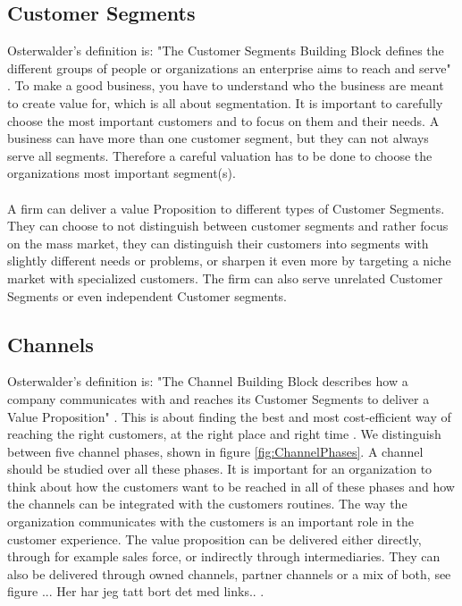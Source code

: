 \subsection{Customer Segments}
Osterwalder's definition is: "The Customer Segments Building Block defines the different groups of people or organizations an enterprise aims to reach and serve" \cite{osterwalder}. To make a good business, you have to understand who the business are meant to create value for, which is all about segmentation. It is important to carefully choose the most important customers and to focus on them and their needs. A business can have more than one customer segment, but they can not always serve all segments. Therefore a careful valuation has to be done to choose the organizations most important segment(s). \cite{osterwalder} \cite{osterwalderthesis} \\ \\
A firm can deliver a value Proposition to different types of Customer Segments. They can choose to not distinguish between customer segments and rather focus on the mass market, they can distinguish their customers into segments with slightly different needs or problems, or sharpen it even more by targeting a niche market with specialized customers. The firm can also serve unrelated Customer Segments or even independent Customer segments. \cite{osterwalder}

\subsection{Channels}
Osterwalder's definition is: "The Channel Building Block describes how a company communicates with and reaches its Customer Segments to deliver a Value Proposition" \cite{osterwalder}. This is about finding the best and most cost-efficient way of reaching the right customers, at the right place and right time \cite{osterwalderthesis}. We distinguish between five channel phases, shown in figure \ref{fig:ChannelPhases}. A channel should be studied over all these phases. It is important for an organization to think about how the customers want to be reached in all of these phases and how the channels can be integrated with the customers routines. The way the organization communicates with the customers is an important role in the customer experience. The value proposition can be delivered either directly, through for example sales force, or indirectly through intermediaries. They can also be delivered through owned channels, partner channels or a mix of both, see figure ...  Her har jeg tatt bort det med links.. 
 \cite{osterwalderthesis}. \\ \\

